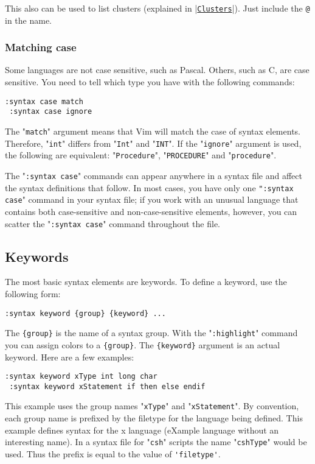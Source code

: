 This also can be used to list clusters (explained in |\hyperref[Clusters]{\texttt{Clusters}}|).
Just include the \verb!@! in the name.

\subsubsection{Matching case}
Some languages are not case sensitive, such as Pascal.
Others, such as C, are case sensitive.
You need to tell which type you have with the following commands:

\begin{Verbatim}[samepage=true]
 :syntax case match
 :syntax case ignore
\end{Verbatim}

The "\verb!match!" argument means that Vim will match the case of syntax elements.
Therefore, "\verb!int!" differs from "\verb!Int!" and "\verb!INT!".
If the "\verb!ignore!" argument is used, the following are equivalent: "\verb!Procedure!", "\verb!PROCEDURE!" and "\verb!procedure!".

The "\verb!:syntax case!" commands can appear anywhere in a syntax file and affect the syntax definitions that follow.
In most cases, you have only one \verb!":syntax case!" command in your syntax file; if you work with an unusual language that contains both case-sensitive and non-case-sensitive elements, however, you can scatter the "\verb!:syntax case!" command throughout the file.
\subsection{Keywords}
The most basic syntax elements are keywords.
To define a keyword, use the following form:

\begin{Verbatim}[samepage=true]
 :syntax keyword {group} {keyword} ...
\end{Verbatim}

The \verb!{group}! is the name of a syntax group.
With the "\verb!:highlight!" command you can assign colors to a \verb!{group}!.
The \verb!{keyword}! argument is an actual keyword.
Here are a few examples:

\begin{Verbatim}[samepage=true]
 :syntax keyword xType int long char
 :syntax keyword xStatement if then else endif
\end{Verbatim}

This example uses the group names "\verb!xType!" and "\verb!xStatement!".
By convention, each group name is prefixed by the filetype for the language being defined.
This example defines syntax for the x language (eXample language without an interesting name).
In a syntax file for "\verb!csh!" scripts the name "\verb!cshType!" would be used.
Thus the prefix is equal to the value of \verb!'filetype'!.

